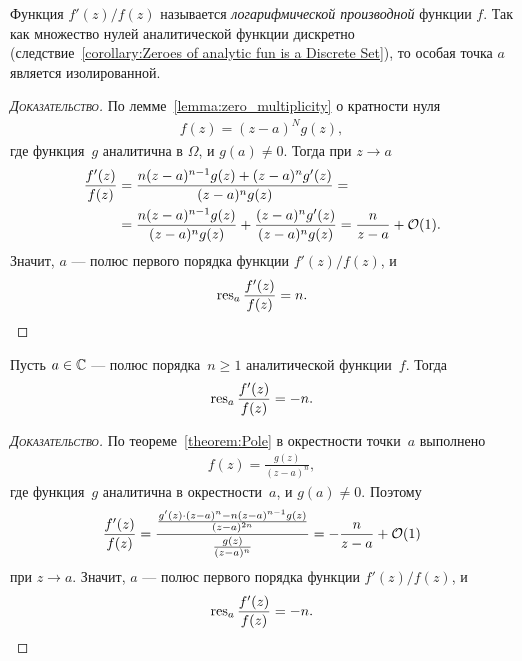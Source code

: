 \documentclass[../complex-analysis.tex]{subfiles}
\begin{document}
Функция $ f'(z)/f(z) $  называется \textit{логарифмической производной} функции $ f $. Так как множество нулей аналитической функции дискретно (следствие~\ref{corollary:Zeroes of analytic fun is a Discrete Set}), то особая точка $ a $ является изолированной.
\begin{proof}[\normalfont\textsc{Доказательство}]
 По лемме~\ref{lemma:zero_multiplicity} о кратности нуля
 \begin{align*}
  f(z)=(z-a)^{N}g(z),
 \end{align*} где функция~$ g $ аналитична в $ \Omega $, и $ g(a) \neq 0 $. Тогда при $ z \to a $
 \begin{align*}
  \frac{f'(z)}{f(z)} &= \frac{n(z-a)^{n-1}g(z) + (z-a)^{n}g'(z)}{(z-a)^{n}g(z)} = \\
  &= \frac{n (z-a)^{n - 1} g(z)}{(z - a)^{n} g(z)} + \frac{(z-a)^{n} g'(z)}{(z-a)^{n} g(z)}= \frac{n}{z-a} + \mathcal{O}(1).
 \end{align*} Значит, $ a $  --- полюс первого порядка функции $ f'(z)/f(z) $, и
 \begin{align*}
  \operatorname{res}_a \frac{f'(z)}{f(z)} = n.
 \end{align*}
\end{proof}

\begin{exmpl}
 \label{example:logarithmic_derivative2}
 Пусть $ a\in\mathbb{C} $ --- полюс порядка~$ n \geqslant 1 $ аналитической функции~$ f $. Тогда
 \begin{align*}
  \operatorname{res}_a \frac{f'(z)}{f(z)} = -n.
 \end{align*}
\end{exmpl}
\begin{proof}[\normalfont\textsc{Доказательство}]
 По теореме~\ref{theorem:Pole} в окрестности точки~$ a $ выполнено
 \begin{align*}
  f(z) = \frac{g(z)}{(z-a)^{n}},
 \end{align*} где функция~$ g $ аналитична в окрестности~$ a $, и $ g(a) \neq 0 $. Поэтому
 \begin{align*}
  \frac{f'(z)}{f(z)} = \frac{ \frac{g'(z) \cdot (z-a)^{n} - n(z-a)^{n-1}g(z)}{(z-a)^{2n}} }{\frac{g(z)}{(z-a)^{n}}} = -\frac{n}{z-a} + \mathcal{O}(1)
 \end{align*} при $ z \to a $. Значит, $ a $ --- полюс первого порядка функции $ f'(z) / f(z) $, и
 \begin{align*}
  \operatorname{res}_a \frac{f'(z)}{f(z)} = -n.
 \end{align*}
\end{proof}
\end{document}

